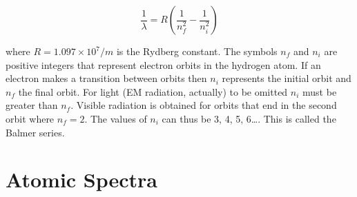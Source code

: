 \begin{equation}\label{e:balmer}
	\frac{1}{\lambda}= R\left(\frac{1}{n_f^2}-\frac{1}{n_i^2}\right)
\end{equation}

where $R = 1.097 \times 10^7/m$ is the Rydberg constant.  The symbols $n_f$ and $n_i$ are positive integers that represent electron orbits in the hydrogen atom.  If an electron makes a transition between orbits then $n_i$ represents the initial orbit and $n_f$ the final orbit.  For light (EM radiation, actually) to be omitted $n_i$ must be greater than $n_f$.  Visible radiation is obtained for orbits that end in the second orbit where $n_f = 2$.  The values of $n_i$ can thus be 3, 4, 5, 6\dots .  This is called the Balmer series.

\section{Atomic Spectra}

